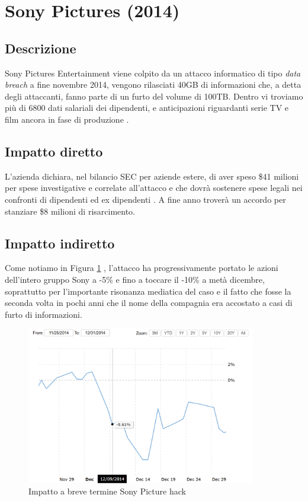 \documentclass[12pt,a4paper,twoside]{report}
\begin{document}
\section{Sony Pictures (2014)}

\subsection{Descrizione}
Sony Pictures Entertainment viene colpito da un attacco informatico di tipo \textit{data breach} a fine novembre 2014, vengono rilasciati 40GB di informazioni che, a detta degli attaccanti, fanno parte di un furto del volume di 100TB. Dentro vi troviamo pi\`u di 6800 dati salariali dei dipendenti, e anticipazioni riguardanti serie TV e film ancora in fase di produzione \cite{SonyPic_buzzfeed}.\\
\subsection{Impatto diretto}
L'azienda dichiara, nel bilancio SEC per aziende estere, di aver speso \$41 milioni per spese investigative e correlate all'attacco e che dovr\`a sostenere spese legali nei confronti di dipendenti ed ex dipendenti \cite{SonyPic_20F_report}. A fine anno trover\`a un accordo per stanziare \$8 milioni di risarcimento.\\

\subsection{Impatto indiretto}
Come notiamo in Figura \ref{fig:sPic1} \cite{macrotrends_sony}, l'attacco ha progressivamente portato le azioni dell'intero gruppo Sony a -5\% e fino a toccare il -10\% a met\`a dicembre, soprattutto per l'importante risonanza mediatica del caso e il fatto che fosse la seconda volta in pochi anni che il nome della compagnia era accostato a casi di furto di informazioni.\\
\begin{figure}[H] 
\begin{center} 
\includegraphics[width=10cm]{figures/sony_2014_short.png} 
\caption[Grafico Sony Pic short]{Impatto a breve termine Sony Picture hack}\label{fig:sPic1}
\end{center}
\end{figure}
\end{document}
